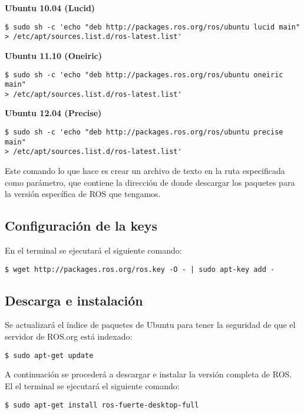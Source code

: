 \documentclass[10pt, a4paper]{report}
\begin{document}
\textbf{Ubuntu 10.04 (Lucid)}
\begin{verbatim}
$ sudo sh -c 'echo "deb http://packages.ros.org/ros/ubuntu lucid main" 
> /etc/apt/sources.list.d/ros-latest.list'
\end{verbatim}

\textbf{Ubuntu 11.10 (Oneiric)}
\begin{verbatim}
$ sudo sh -c 'echo "deb http://packages.ros.org/ros/ubuntu oneiric main" 
> /etc/apt/sources.list.d/ros-latest.list'
\end{verbatim}

\textbf{Ubuntu 12.04 (Precise)}
\begin{verbatim}
$ sudo sh -c 'echo "deb http://packages.ros.org/ros/ubuntu precise main" 
> /etc/apt/sources.list.d/ros-latest.list'
\end{verbatim}

Este comando lo que hace es crear un archivo de texto en la ruta especificada como parámetro, que contiene la dirección de donde descargar los paquetes para la versión específica de ROS que tengamos.

\subsection{Configuración de la keys}

En el terminal se ejecutará el siguiente comando:

\begin{verbatim}
$ wget http://packages.ros.org/ros.key -O - | sudo apt-key add -
\end{verbatim}

\subsection{Descarga e instalación}

Se actualizará el índice de paquetes de Ubuntu para tener la seguridad de que el servidor de ROS.org está indexado:

\begin{verbatim}
$ sudo apt-get update
\end{verbatim}

A continuación se procederá a descargar e instalar la versión completa de ROS. El el terminal se ejecutará el siguiente comando:

\begin{verbatim}
$ sudo apt-get install ros-fuerte-desktop-full
\end{verbatim}
\end{document}

